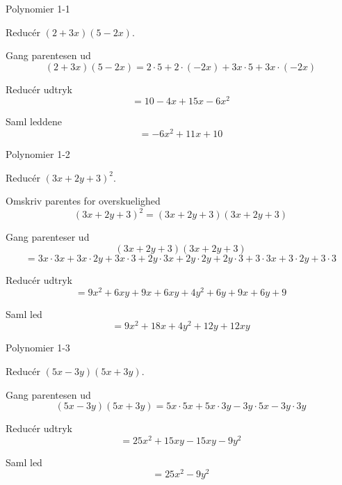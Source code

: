 \documentclass{article}
\begin{document}
\tableofcontents
\newpage

\begin{exercise}{Polynomier 1-1}

Reducér $(2 + 3x)(5 - 2x)$.


\hint

Gang parentesen ud
\[
(2 + 3x)(5 - 2x) = 2 \cdot 5 + 2 \cdot (-2x) + 3x \cdot 5 + 3x \cdot (-2x)
\]

\hint

Reducér udtryk
\[
= 10 - 4x + 15x - 6x^2
\]


\hint

Saml leddene
\[
= -6x^2 +11x + 10
\]

\end{exercise}

\newpage

\begin{exercise}{Polynomier 1-2}

Reducér $(3x + 2y + 3)^2$.


\hint

Omskriv parentes for overskuelighed
\[
(3x + 2y + 3)^2 = (3x + 2y + 3)(3x + 2y + 3)
\]

\hint

Gang parenteser ud
\[
(3x + 2y + 3)(3x + 2y + 3)
\]
\[
= 3x \cdot 3x + 3x \cdot 2y + 3x \cdot 3 + 2y \cdot 3x + 2y \cdot 2y + 2y \cdot 3 + 3 \cdot 3x + 3 \cdot 2y + 3 \cdot 3
\]

\hint

Reducér udtryk
\[
= 9x^2 + 6xy + 9x + 6xy + 4y^2 + 6y + 9x + 6y + 9
\]


\hint

Saml led
\[
= 9x^2 + 18x + 4y^2 + 12y + 12xy
\]

\end{exercise}

\newpage

\begin{exercise}{Polynomier 1-3}

Reducér $(5x - 3y)(5x + 3y)$.


\hint

Gang parentesen ud
\[
(5x - 3y)(5x + 3y) = 5x \cdot 5x + 5x \cdot 3y - 3y \cdot 5x - 3y \cdot 3y
\]

\hint

Reducér udtryk
\[
= 25x^2 + 15xy - 15xy - 9y^2
\]


\hint

Saml led
\[
= 25x^2 - 9y^2
\]

\end{exercise}
\end{document}
